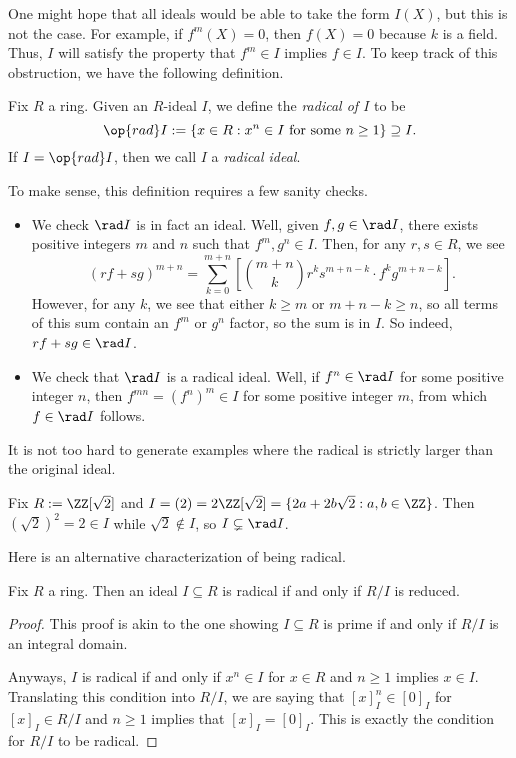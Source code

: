 One might hope that all ideals would be able to take the form $I(X)$, but this is not the case. For example, if $f^m(X)=0$, then $f(X)=0$ because $k$ is a field. Thus, $I$ will satisfy the property that $f^m\in I$ implies $f\in I$. To keep track of this obstruction, we have the following definition.
\begin{definition}[Radical]
	Fix $R$ a ring. Given an $R$-ideal $I$, we define the \textit{radical of $I$} to be
	\[\op{rad}I:=\left\{x\in R:x^n\in I\text{ for some }n\ge1\right\}\supseteq I.\]
	If $I=\op{rad}I$, then we call $I$ a \textit{radical ideal}.
\end{definition}
To make sense, this definition requires a few sanity checks.
\begin{itemize}
	\item We check $\rad I$ is in fact an ideal. Well, given $f,g\in\rad I$, there exists positive integers $m$ and $n$ such that $f^m,g^n\in I$. Then, for any $r,s\in R$, we see
	\[(rf+sg)^{m+n}=\sum_{k=0}^{m+n}\left[\binom{m+n}kr^ks^{m+n-k}\cdot f^kg^{m+n-k}\right].\]
	However, for any $k$, we see that either $k\ge m$ or $m+n-k\ge n$, so all terms of this sum contain an $f^m$ or $g^n$ factor, so the sum is in $I$. So indeed, $rf+sg\in\rad I$.
	\item We check that $\rad I$ is a radical ideal. Well, if $f^n\in\rad I$ for some positive integer $n$, then $f^{mn}=\left(f^n\right)^m\in I$ for some positive integer $m$, from which $f\in\rad I$ follows.
\end{itemize}
It is not too hard to generate examples where the radical is strictly larger than the original ideal.
\begin{example}
	Fix $R:=\ZZ[\sqrt2]$ and $I=(2)=2\ZZ[\sqrt2]=\{2a+2b\sqrt2:a,b\in\ZZ\}$. Then $\left(\sqrt2\right)^2=2\in I$ while $\sqrt2\notin I$, so $I\subsetneq\rad I$.
\end{example}
Here is an alternative characterization of being radical.
\begin{lemma}
	Fix $R$ a ring. Then an ideal $I\subseteq R$ is radical if and only if $R/I$ is reduced.
\end{lemma}
\begin{proof}
	This proof is akin to the one showing $I\subseteq R$ is prime if and only if $R/I$ is an integral domain.

	Anyways, $I$ is radical if and only if $x^n\in I$ for $x\in R$ and $n\ge1$ implies $x\in I$. Translating this condition into $R/I$, we are saying that $[x]_I^n\in[0]_I$ for $[x]_I\in R/I$ and $n\ge1$ implies that $[x]_I=[0]_I$. This is exactly the condition for $R/I$ to be radical.
\end{proof}
